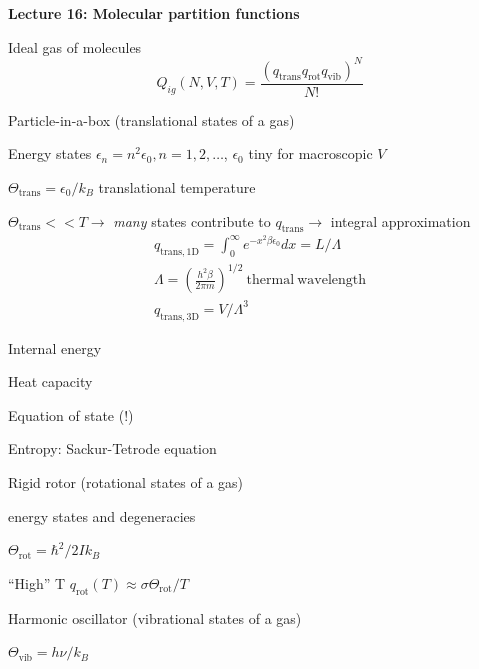\documentclass[11pt]{article}
\begin{document}
\begin{outline}
  \item{\bf Lecture 16: Molecular partition functions}
    \begin{outline}
    \item Ideal gas of molecules
      \begin{displaymath}
        Q_{ig}(N,V,T) = \frac{(q_\mathrm{trans}q_\mathrm{rot}q_\mathrm{vib})^N}{N!}
      \end{displaymath}

      \item Particle-in-a-box (translational states of a gas)
        \begin{outline}
          \item Energy states $\epsilon_n=n^2\epsilon_0, n=1,2, \ldots$,
            $\epsilon_0$ tiny for macroscopic $V$
          \item $\Theta_\mathrm{trans} = \epsilon_0/k_B$ translational temperature
          \item $\Theta_\mathrm{trans} << T \rightarrow$ {\em many} states contribute
            to $q_\mathrm{trans}\rightarrow$ integral approximation
            \begin{eqnarray*}
              q_\mathrm{trans,1D} = \int_0^\infty e^{-x^2\beta\epsilon_0}dx =
              L/\Lambda \\
              \Lambda = \left ( \frac{h^2\beta}{2\pi m} \right )^{1/2}\
              \mathrm{thermal\ wavelength} \\
              q_\mathrm{trans,3D} = V/\Lambda^3
            \end{eqnarray*}
          \item Internal energy
          \item Heat capacity
          \item Equation of state (!)
          \item Entropy: Sackur-Tetrode equation
        \end{outline}
      \item Rigid rotor (rotational states of a gas)
        \begin{outline}
        \item energy states and degeneracies
        \item $\Theta_\mathrm{rot} = \hbar^2/2 I k_B$
        \item ``High'' T $q_\mathrm{rot}(T) \approx \sigma \Theta_\mathrm{rot}/T$
        \end{outline}
      \item Harmonic oscillator (vibrational states of a gas)
        \begin{outline}
          \item $\Theta_\mathrm{vib}=h\nu/k_B$
        \end{outline}


\end{outline}
\end{outline}
\end{document}
